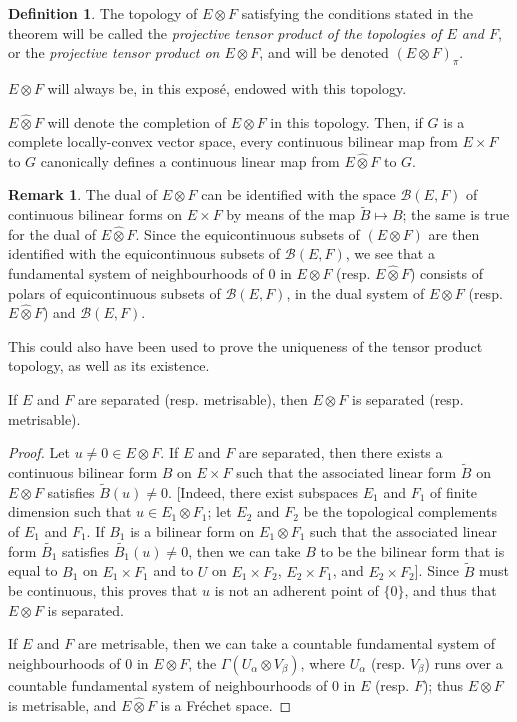 \documentclass{article}
\theoremstyle{plain}
\newenvironment{proposition}[1]
    {\renewcommand\theinnercustomproposition{#1}\innercustomproposition}
    {\endinnercustomproposition}
\theoremstyle{definition}
\newtheorem*{remark}{Remark}
\newtheorem*{definition}{Definition}
\newcommand{\BB}{\mathcal{B}}
\newcommand{\cotimes}{\widehat{\otimes}}
\newcommand{\oldpage}[1]{\marginpar{\phantom{.}\\\footnotesize$\Big\vert$ \textit{p.~#1}}}
\begin{document}
\begin{definition}
  The topology of $E\otimes F$ satisfying the conditions stated in the theorem will be called the \emph{projective tensor product of the topologies of $E$ and $F$}, or the \emph{projective tensor product on $E\otimes F$}, and will be denoted $(E\otimes F)_\pi$.

  $E\otimes F$ will always be, in this expos\'{e}, endowed with this topology.

  $E\cotimes F$ will denote the completion of $E\otimes F$ in this topology.
  Then, if $G$ is a complete locally-convex vector space, every continuous bilinear map from $E\times F$ to $G$ canonically defines a continuous linear map from $E\cotimes F$ to $G$.
\end{definition}

\begin{remark}
  The dual of $E\otimes F$ can be identified with the space $\BB(E,F)$ of continuous bilinear forms on $E\times F$ by means of the map $\widetilde{B}\mapsto B$;
  the same is true for the dual of $E\cotimes F$.
  Since the equicontinuous subsets of $(E\otimes F)$ are then identified with the equicontinuous subsets of $\BB(E,F)$, we see that a fundamental system of neighbourhoods of $0$ in $E\otimes F$ (resp. $E\cotimes F$) consists of polars of equicontinuous subsets of $\BB(E,F)$, in the dual system of $E\otimes F$ (resp. $E\cotimes F$) and $\BB(E,F)$.
\end{remark}

\oldpage{3}
This could also have been used to prove the uniqueness of the tensor product topology, as well as its existence.

\begin{proposition}{2}
\label{proposition2}
  If $E$ and $F$ are separated (resp. metrisable), then $E\otimes F$ is separated (resp. metrisable).
\end{proposition}

\begin{proof}
  Let $u\neq0\in E\otimes F$.
  If $E$ and $F$ are separated, then there exists a continuous bilinear form $B$ on $E\times F$ such that the associated linear form $\widetilde{B}$ on $E\otimes F$ satisfies $\widetilde{B}(u)\neq0$.
  [Indeed, there exist subspaces $E_1$ and $F_1$ of finite dimension such that $u\in E_1\otimes F_1$;
  let $E_2$ and $F_2$ be the topological complements of $E_1$ and $F_1$.
  If $B_1$ is a bilinear form on $E_1\otimes F_1$ such that the associated linear form $\widetilde{B_1}$ satisfies $\widetilde{B_1}(u)\neq0$, then we can take $B$ to be the bilinear form that is equal to $B_1$ on $E_1\times F_1$ and to $U$ on $E_1\times F_2$, $E_2\times F_1$, and $E_2\times F_2$].
  Since $\widetilde{B}$ must be continuous, this proves that $u$ is not an adherent point of $\{0\}$, and thus that $E\otimes F$ is separated.

  If $E$ and $F$ are metrisable, then we can take a countable fundamental system of neighbourhoods of $0$ in $E\otimes F$, the $\Gamma(U_\alpha\otimes V_\beta)$, where $U_\alpha$ (resp. $V_\beta$) runs over a countable fundamental system of neighbourhoods of $0$ in $E$ (resp. $F$);
  thus $E\otimes F$ is metrisable, and $E\cotimes F$ is a Fr\'{e}chet space.
\end{proof}
\end{document}
